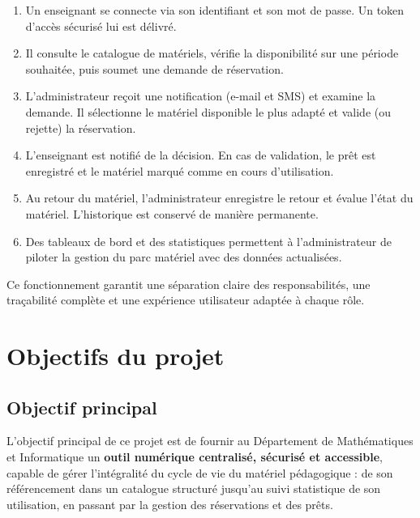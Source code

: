 \documentclass[12pt,a4paper]{report}
\begin{document}
\begin{enumerate}
  \item Un enseignant se connecte via son identifiant et son mot de passe.
        Un token d'acc\`es s\'ecuris\'e lui est d\'elivr\'e.
  \item Il consulte le catalogue de mat\'eriels, v\'erifie la disponibilit\'e
        sur une p\'eriode souhait\'ee, puis soumet une demande de
        r\'eservation.
  \item L'administrateur re\c{c}oit une notification (e-mail et SMS) et
        examine la demande. Il s\'electionne le mat\'eriel disponible le
        plus adapt\'e et valide (ou rejette) la r\'eservation.
  \item L'enseignant est notifi\'e de la d\'ecision. En cas de validation,
        le pr\^et est enregistr\'e et le mat\'eriel marqu\'e comme en cours
        d'utilisation.
  \item Au retour du mat\'eriel, l'administrateur enregistre le retour et
        \'evalue l'\'etat du mat\'eriel. L'historique est conserv\'e de
        mani\`ere permanente.
  \item Des tableaux de bord et des statistiques permettent \`a
        l'administrateur de piloter la gestion du parc mat\'eriel avec
        des donn\'ees actualis\'ees.
\end{enumerate}

Ce fonctionnement garantit une s\'eparation claire des responsabilit\'es,
une tra\c{c}abilit\'e compl\`ete et une exp\'erience utilisateur adapt\'ee
\`a chaque r\^ole.

\chapter{Objectifs du projet}

\section{Objectif principal}

L'objectif principal de ce projet est de fournir au D\'epartement de
Math\'ematiques et Informatique un \textbf{outil num\'erique centralis\'e,
s\'ecuris\'e et accessible}, capable de g\'erer l'int\'egralit\'e du
cycle de vie du mat\'eriel p\'edagogique : de son r\'ef\'erencement dans
un catalogue structur\'e jusqu'au suivi statistique de son utilisation,
en passant par la gestion des r\'eservations et des pr\^ets.
\end{document}
